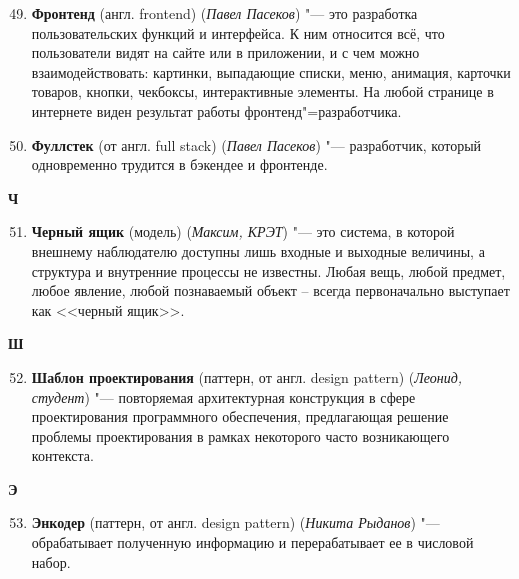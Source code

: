 \begin{enumerate}
\setcounter{enumi}{48}
    \item \textbf{Фронтенд} (англ. frontend) (\textit{Павел Пасеков}) "--- 
    это разработка пользовательских функций и интерфейса. К ним относится всё, что пользователи видят на сайте или в приложении, и с чем можно взаимодействовать: картинки, выпадающие списки, меню, анимация, карточки товаров, кнопки, чекбоксы, интерактивные элементы. На любой странице в интернете виден результат работы фронтенд"=разработчика.
    \item \textbf{Фуллстек} (от англ. full stack) (\textit{Павел Пасеков}) "--- 
    разработчик, который одновременно трудится в бэкендее и фронтенде.
\end{enumerate}

\begin{flushleft} \large\textbf{Ч} \end{flushleft}

\begin{enumerate}
\setcounter{enumi}{50}

     \item \textbf{Черный ящик} (модель) (\textit{Максим, КРЭТ}) "--- 
     это система, в которой внешнему наблюдателю доступны лишь входные и выходные величины, а структура и внутренние процессы не известны. Любая вещь, любой предмет, любое явление, любой познаваемый объект – всегда первоначально выступает как <<черный ящик>>.
     
\end{enumerate}

\begin{flushleft} \large\textbf{Ш} \end{flushleft}

\begin{enumerate}
\setcounter{enumi}{51}
 
     \item \textbf{Шаблон проектирования}  (паттерн, от англ. design pattern) (\textit{Леонид, студент}) "--- 
      повторяемая архитектурная конструкция в сфере проектирования программного обеспечения, предлагающая решение проблемы проектирования в рамках некоторого часто возникающего контекста.
     
\end{enumerate}

\begin{flushleft} \large\textbf{Э} \end{flushleft}

\begin{enumerate}
\setcounter{enumi}{52}
 
     \item \textbf{Энкодер}  (паттерн, от англ. design pattern) (\textit{Никита Рыданов}) "--- 
      обрабатывает полученную информацию и перерабатывает ее в числовой набор.
     
\end{enumerate}
